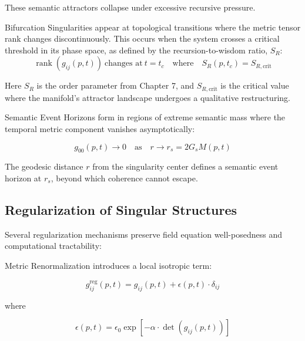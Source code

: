 These semantic attractors collapse under excessive recursive pressure.

Bifurcation Singularities appear at topological transitions where the metric tensor rank changes discontinuously. This occurs when the system crosses a critical threshold in its phase space, as defined by the recursion-to-wisdom ratio, \(S_R\):
\begin{equation}
\operatorname{rank}(g_{ij}(p, t)) \ \text{changes at} \ t = t_c \quad \text{where} \quad S_R(p, t_c) = S_{R, \text{crit}}
\end{equation}

Here \(S_R\) is the order parameter from Chapter 7, and \(S_{R, \text{crit}}\) is the critical value where the manifold's attractor landscape undergoes a qualitative restructuring.

Semantic Event Horizons form in regions of extreme semantic mass where the temporal metric component vanishes asymptotically:

\begin{equation}
g_{00}(p, t) \to 0 \quad \text{as} \quad r \to r_s = 2G_s M(p, t)
\end{equation}

The geodesic distance \(r\) from the singularity center defines a semantic event horizon at \(r_s\), beyond which coherence cannot escape.


\subsection{Regularization of Singular Structures}
\label{sec:regularization_of_singular_structures}

Several regularization mechanisms preserve field equation well-posedness and computational tractability:

Metric Renormalization introduces a local isotropic term:

\begin{equation}
g_{ij}^{\text{reg}}(p, t) = g_{ij}(p, t) + \epsilon(p, t) \cdot \delta_{ij}
\end{equation}

where

\begin{equation}
\epsilon(p, t) = \epsilon_0 \exp\left[-\alpha \cdot \det(g_{ij}(p, t))\right]
\end{equation}

